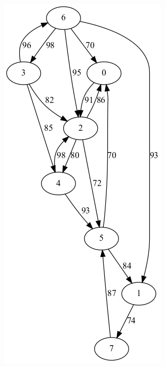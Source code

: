 \documentclass{article}
\begin{document}
\begin{figure}[!htb]
  \includegraphics[width=\linewidth]{"./output/scc_example_inv.png"}

\end{figure}
\end{document}
